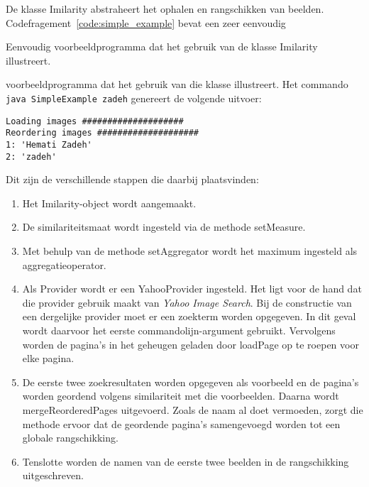 De klasse {\klassefont Imilarity} abstraheert het ophalen en rangschikken van
beelden. Codefragement~\ref{code:simple_example} bevat een zeer eenvoudig 
\begin{code}[bp]
\vspace{5pt}
\begin{lgrind}

\end{lgrind}
\vspace{5pt}
\caption{\label{code:simple_example}Eenvoudig voorbeeldprogramma dat het gebruik van
de klasse {\klassefont Imilarity} illustreert.}
\end{code}
voorbeeldprogramma dat het gebruik van die klasse illustreert. Het commando
\texttt{java SimpleExample zadeh} genereert de volgende uitvoer:
\begin{verbatim}
Loading images ####################
Reordering images ####################
1: 'Hemati Zadeh'
2: 'zadeh'
\end{verbatim} 
Dit zijn de verschillende stappen die daarbij plaatsvinden:
\begin{enumerate}
  \item Het {\klassefont Imilarity}-object wordt aangemaakt.
  \item De similariteitsmaat wordt ingesteld via de methode {\klassefont setMeasure}.
  \item Met behulp van de methode {\klassefont setAggregator} wordt het maximum ingesteld als
		aggregatieoperator. 
  \item Als {\klassefont Provider} wordt er een {\klassefont YahooProvider} ingesteld.
  	    Het ligt voor de hand dat die provider gebruik maakt van
  	    \emph{Yahoo Image Search}. Bij de constructie van een dergelijke provider
  	    moet er een zoekterm worden opgegeven. In dit geval wordt daarvoor het eerste 
  	    commandolijn-argument gebruikt. Vervolgens worden de pagina's in 
  	    het geheugen geladen door {\klassefont loadPage} op te roepen voor elke pagina.
  \item De eerste twee zoekresultaten worden opgegeven als voorbeeld en de pagina's
        worden geordend volgens similariteit met die voorbeelden. Daarna wordt
        {\klassefont mergeReorderedPages} uitgevoerd. Zoals de naam al doet vermoeden,
        zorgt die methode ervoor dat de geordende pagina's samengevoegd 
        worden tot een globale rangschikking.
  \item Tenslotte worden de namen van de eerste twee beelden in de rangschikking 
  	    uitgeschreven.
\end{enumerate}

